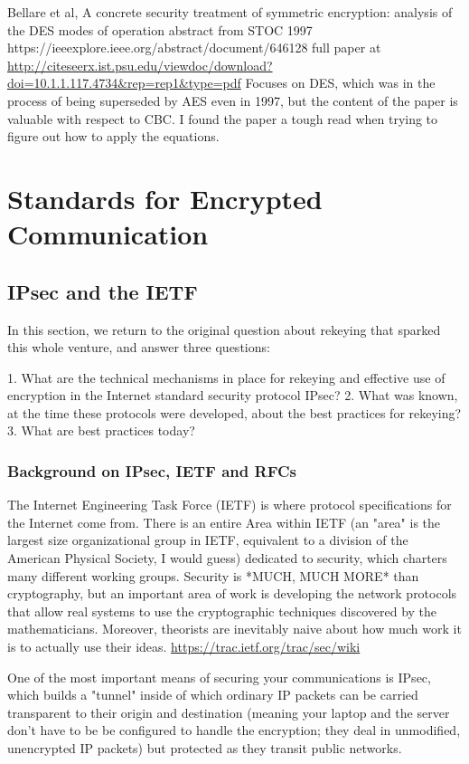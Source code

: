 \documentclass[%
 aip,
 jmp,%
 amsmath,amssymb,
 reprint,%
]{revtex4-1}
\begin{document}
Bellare et al, A concrete security treatment of symmetric encryption:
analysis of the DES modes of operation
abstract from STOC 1997
https://ieeexplore.ieee.org/abstract/document/646128
full paper at
\url{http://citeseerx.ist.psu.edu/viewdoc/download?doi=10.1.1.117.4734&rep=rep1&type=pdf}
Focuses on DES, which was in the process of being superseded by AES
even in 1997, but the content of the paper is valuable with respect to
CBC.  I found the paper a tough read when trying to figure out how to
apply the equations.

\section{Standards for Encrypted Communication}

\subsection{IPsec and the IETF}

In this section, we return to the original question about rekeying
that sparked this whole venture, and answer three questions:

1. What are the technical mechanisms in place for rekeying and
   effective use of encryption in the Internet standard security
   protocol IPsec?
2. What was known, at the time these protocols were developed, about
   the best practices for rekeying?
3. What are best practices today?

\subsubsection{Background on IPsec, IETF and RFCs}

The Internet Engineering Task Force (IETF) is where protocol
specifications for the Internet come from.  There is an entire Area
within IETF (an "area" is the largest size organizational group in
IETF, equivalent to a division of the American Physical Society, I
would guess) dedicated to security, which charters many different
working groups.  Security is *MUCH, MUCH MORE* than cryptography, but
an important area of work is developing the network protocols that
allow real systems to use the cryptographic techniques discovered by
the mathematicians.  Moreover, theorists are inevitably naive about
how much work it is to actually use their ideas.
\url{https://trac.ietf.org/trac/sec/wiki}

One of the most important means of securing your communications is
IPsec, which builds a "tunnel" inside of which ordinary IP packets can
be carried transparent to their origin and destination (meaning your
laptop and the server don't have to be be configured to handle the
encryption; they deal in unmodified, unencrypted IP packets) but
protected as they transit public networks.
\end{document}

